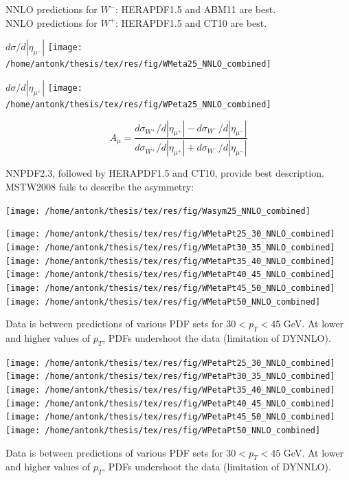 {

\small{NNLO predictions for $W^-$: HERAPDF1.5 and ABM11 are best.} \\
\small{NNLO predictions for $W^+$: HERAPDF1.5 and CT10 are best.}

\vspace{.2cm}
\colb[T]
\centering
$d\sigma/d|\eta_{\mu^{-}}|$
\texttt{[image: /home/antonk/thesis/tex/res/fig/WMeta25\_NNLO\_combined]}

\centering
$d\sigma/d|\eta_{\mu^{+}}|$
\texttt{[image: /home/antonk/thesis/tex/res/fig/WPeta25\_NNLO\_combined]}
\cole
}


{

\centering
$$A_{\mu} = \frac{d\sigma_{W^{+}}/d|\eta_{\mu^{+}}| - d\sigma_{W^{-}}/d|\eta_{\mu^{-}}|}{d\sigma_{W^{+}}/d|\eta_{\mu^{+}}| + d\sigma_{W^{-}}/d|\eta_{\mu^{-}}|}$$

\centering
\small{NNPDF2.3, followed by HERAPDF1.5 and CT10, provide best description. \\
MSTW2008 fails to describe the asymmetry:}

\centering
\texttt{[image: /home/antonk/thesis/tex/res/fig/Wasym25\_NNLO\_combined]}

}

{
	  \texttt{[image: /home/antonk/thesis/tex/res/fig/WMetaPt25\_30\_NNLO\_combined]}
	  \texttt{[image: /home/antonk/thesis/tex/res/fig/WMetaPt30\_35\_NNLO\_combined]}
	  \texttt{[image: /home/antonk/thesis/tex/res/fig/WMetaPt35\_40\_NNLO\_combined]} \\
	  \texttt{[image: /home/antonk/thesis/tex/res/fig/WMetaPt40\_45\_NNLO\_combined]}
	  \texttt{[image: /home/antonk/thesis/tex/res/fig/WMetaPt45\_50\_NNLO\_combined]}
	  \texttt{[image: /home/antonk/thesis/tex/res/fig/WMetaPt50\_NNLO\_combined]}

\centering
\small{Data is between predictions of various PDF sets for $30<p_T<45$ GeV. At lower and higher values of $p_T$, PDFs undershoot the data (limitation of DYNNLO). }

}

{
	  \texttt{[image: /home/antonk/thesis/tex/res/fig/WPetaPt25\_30\_NNLO\_combined]}
	  \texttt{[image: /home/antonk/thesis/tex/res/fig/WPetaPt30\_35\_NNLO\_combined]}
	  \texttt{[image: /home/antonk/thesis/tex/res/fig/WPetaPt35\_40\_NNLO\_combined]} \\
	  \texttt{[image: /home/antonk/thesis/tex/res/fig/WPetaPt40\_45\_NNLO\_combined]}
	  \texttt{[image: /home/antonk/thesis/tex/res/fig/WPetaPt45\_50\_NNLO\_combined]}
	  \texttt{[image: /home/antonk/thesis/tex/res/fig/WPetaPt50\_NNLO\_combined]}

\centering
\small{Data is between predictions of various PDF sets for $30<p_T<45$ GeV. At lower and higher values of $p_T$, PDFs undershoot the data (limitation of DYNNLO). }

}

